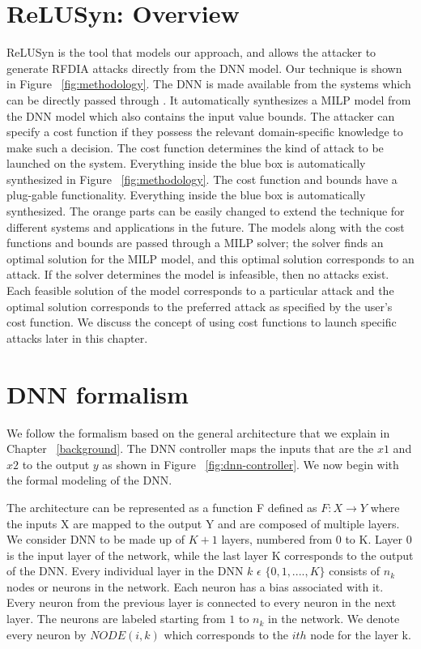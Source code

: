 \section{ReLUSyn: Overview}
ReLUSyn is the tool that models our approach, and allows the attacker to generate \ac{RFDIA} attacks directly from the \ac{DNN} model. 
Our technique is shown in Figure ~\ref{fig:methodology}.
The \ac{DNN} is made available from the systems which can be directly passed through \tool. 
It automatically synthesizes a \ac{MILP} model from the \ac{DNN} model which also contains the input value bounds.
The attacker can specify a cost function if they possess the relevant domain-specific knowledge to make such a decision. 
The cost function determines the kind of attack to be launched on the system.
Everything inside the blue box is automatically synthesized in Figure ~\ref{fig:methodology}.
The cost function and bounds have a plug-gable  functionality. 
Everything inside the blue box is automatically synthesized. 
The orange parts can be easily changed to extend the technique for different systems and applications in the future. 
The models along with the cost functions and bounds are passed through a MILP solver; the solver finds an optimal solution for the MILP model, and this optimal solution corresponds to an attack. If the solver determines the model is infeasible, then no attacks exist.
Each feasible solution of the model corresponds to a particular attack 
and the optimal solution corresponds to the preferred attack as specified by the user's cost function. We discuss the concept of using cost functions to launch specific attacks later in this chapter.
	
\section{DNN formalism}
We follow the formalism based on the general architecture that we explain in Chapter ~\ref{background}. 
The \ac{DNN} controller maps the inputs that are the $x1$ and $x2$ to the output $y$ as shown in  Figure ~\ref{fig:dnn-controller}.   
We now begin with the formal modeling of the \ac{DNN}.


The architecture can be represented as a function F defined as $F: X \rightarrow Y$ where the inputs X are mapped to the output Y and are composed of multiple layers. 
We consider \ac{DNN} to be made up of $K + 1$ layers, numbered from 0 to K.
Layer 0 %
is the input layer of the network, while
the last layer K corresponds to the output of the \ac{DNN}.
Every individual layer in the \ac{DNN} $k$ $\epsilon$ $\{0,1,....,K\}$ consists of $n_k$ nodes or neurons in the network.
Each neuron has a bias associated with it. 
Every neuron from the previous layer is connected to every neuron in the next layer. 
The neurons are labeled starting from $1$ to $n_k$ in the network. 
We denote every neuron by $NODE(i,k)$ which corresponds to the $ith$ node for the layer k. 

